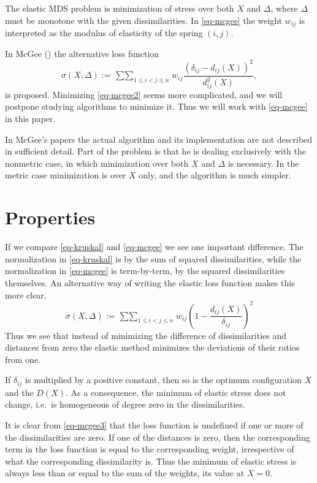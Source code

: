 \documentclass[
  12pt,
  letterpaper,
  DIV=11,
  numbers=noendperiod]{scrartcl}
\begin{document}
The elastic MDS problem is minimization of stress over both \(X\) and
\(\Delta\), where \(\Delta\) must be monotone with the given
dissimilarities. In \eqref{eq-mcgee} the weight \(w_{ij}\) is
interpreted as the modulus of elasticity of the spring \((i,j)\).

In McGee () the alternative loss function
\begin{equation}
  \sigma(X,\Delta) := \mathop{\sum\sum}_{1 \leq i<j \leq n}w_{ij}\frac{(\delta_{ij} - d_{ij}(X))^2}{d_{ij}^2(X)},\label{eq-mcgee2}
\end{equation} is proposed. Minimizing \eqref{eq-mcgee2} seems more
complicated, and we will postpone studying algorithms to minimize it.
Thus we will work with \eqref{eq-mcgee} in this paper.

In McGee's papers the actual algorithm and its implementation are not
described in sufficient detail. Part of the problem is that he is
dealing exclusively with the nonmetric case, in which minimization over
both \(X\) and \(\Delta\) is necessary. In the metric case minimization
is over \(X\) only, and the algorithm is much simpler.

\section{Properties}\label{properties}

If we compare \eqref{eq-kruskal} and \eqref{eq-mcgee} we see one
important difference. The normalization in \eqref{eq-kruskal} is by the
sum of squared dissimilarities, while the normalization in
\eqref{eq-mcgee} is term-by-term, by the squared dissimilarities
themselves. An alternative way of writing the elastic loss function
makes this more clear. \begin{equation}
  \sigma(X,\Delta) := \mathop{\sum\sum}_{1 \leq i<j \leq n}w_{ij}\left( 1 - \frac{d_{ij}(X)}{\delta_{ij}} \right)^2\label{eq-mcgee3}
\end{equation} Thus we see that instead of minimizing the difference of
dissimilarities and distances from zero the elastic method minimizes the
deviations of their ratios from one.

If \(\delta_{ij}\) is multiplied by a positive constant, then so is the
optimum configuration \(X\) and the \(D(X)\). As a consequence, the
minimum of elastic stress does not change, i.e.~is homogeneous of degree
zero in the dissimilarities.

It is clear from \eqref{eq-mcgee3} that the loss function is undefined
if one or more of the dissimilarities are zero. If one of the distances
is zero, then the corresponding term in the loss function is equal to
the corresponding weight, irrespective of what the corresponding
dissimilarity is. Thus the minimum of elastic stress is always less than
or equal to the sum of the weights, its value at \(X = 0\).
\end{document}
